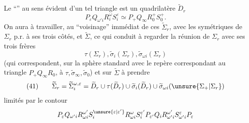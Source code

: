 Le ``''  au sens évident d'un tel triangle est un quadrilatère $\widetilde D_r$
\[
P_\varepsilon Q_{\omega'i}R_i^\omega S_i^\varepsilon\simeq P_+Q_\infty R_0^+S_0^+.
\]
On aura à travailler, au ``voisinage'' immédiat de ces    $\widetilde\Sigma_r$, avec les symétriques de $\Sigma_r$ p.r. à ses trois côtés, et  $\widetilde\Sigma$,  ce qui conduit à regarder la réunion de $\Sigma_r$ avec ses trois frères
\[
\tau(\Sigma_r),\widetilde\sigma_i(\Sigma_r),\widetilde\sigma_{\omega i}(\Sigma_r)
\]
(qui  correspondent, sur la sphère standard avec le repère correspondant au triangle $P_+Q_\infty R_0$, à $\tau,\widetilde\sigma_\infty,\widetilde\sigma_0$) et sur $\widetilde\Sigma$ à prendre
\[
(41)\qquad\widetilde\Sigma_r=\widetilde\Sigma_i^{\omega,\varepsilon}=\widetilde D_r\cup\tau(\widetilde D_r)\cup\widetilde\sigma_i(\widetilde D_r)\cup\widetilde\sigma_{\omega i}(\unsure{\Sigma_+|\Sigma_r})
\]
limités par le contour
\[
P_\varepsilon Q_{\omega'i}R_{\omega i}^{\omega'}S_i^{\unsure{\varepsilon|\varepsilon'}}R_{\omega i}^{\omega}S_i^{\varepsilon'}P_{\varepsilon'}Q_iR_{\omega'i}^{\omega'}S_{\omega'i}^\varepsilon P_\varepsilon
\]

